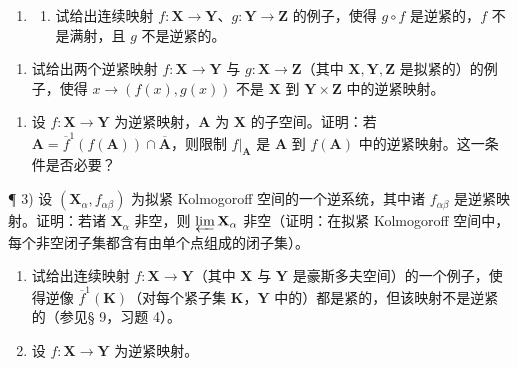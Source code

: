 \BourbakiExerciseGroup

\begin{enumerate}
\def\labelenumi{\arabic{enumi})}
\tightlist
\item
  \begin{enumerate}
  \def\labelenumii{\alph{enumii})}
  \tightlist
  \item
    试给出连续映射 \(f: \mathbf{X} \to \mathbf{Y}\)、\(g: \mathbf{Y} \to \mathbf{Z}\) 的例子，使得 \(g \circ f\) 是逆紧的，\(f\) 不是满射，且 \(g\) 不是逆紧的。
  \end{enumerate}
\end{enumerate}

\begin{enumerate}
\def\labelenumi{\alph{enumi})}
\setcounter{enumi}{1}
\tightlist
\item
  试给出两个逆紧映射 \(f: \mathbf{X} \to \mathbf{Y}\) 与 \(g: \mathbf{X} \to \mathbf{Z}\)（其中 \(\mathbf{X}, \mathbf{Y}, \mathbf{Z}\) 是拟紧的）的例子，使得 \(x \to (f(x), g(x))\) 不是 \(\mathbf{X}\) 到 \(\mathbf{Y} \times \mathbf{Z}\) 中的逆紧映射。
\end{enumerate}

\begin{enumerate}
\def\labelenumi{\arabic{enumi})}
\setcounter{enumi}{1}
\tightlist
\item
  设 \(f: \mathbf{X} \to \mathbf{Y}\) 为逆紧映射，\(\mathbf{A}\) 为 \(\mathbf{X}\) 的子空间。证明：若 \(\mathbf{A} = \overline{f}^1(f(\mathbf{A})) \cap \overline{\mathbf{A}}\)，则限制 \(f|_{\mathbf{A}}\) 是 \(\mathbf{A}\) 到 \(f(\mathbf{A})\) 中的逆紧映射。这一条件是否必要？
\end{enumerate}

¶ 3) 设 \((\mathbf{X}_{\alpha}, f_{\alpha\beta})\) 为拟紧 Kolmogoroff 空间的一个逆系统，其中诸 \(f_{\alpha\beta}\) 是逆紧映射。证明：若诸 \(\mathbf{X}_{\alpha}\) 非空，则 \(\varprojlim \mathbf{X}_{\alpha}\) 非空（证明：在拟紧 Kolmogoroff 空间中，每个非空闭子集都含有由单个点组成的闭子集）。

\begin{enumerate}
\def\labelenumi{\arabic{enumi})}
\setcounter{enumi}{3}
\item
  试给出连续映射 \(f: \mathbf{X} \to \mathbf{Y}\)（其中 \(\mathbf{X}\) 与 \(\mathbf{Y}\) 是豪斯多夫空间）的一个例子，使得逆像 \(\overline{f}^1(\mathbf{K})\)（对每个紧子集 \(\mathbf{K}\)，\(\mathbf{Y}\) 中的）都是紧的，但该映射不是逆紧的（参见§ 9，习题 4）。
\item
  设 \(f: \mathbf{X} \to \mathbf{Y}\) 为逆紧映射。
\end{enumerate}

